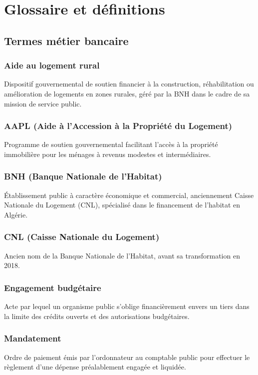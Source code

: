 \chapter{Glossaire et définitions}
\label{app:glossaire}

\section{Termes métier bancaire}

\subsection{Aide au logement rural}
Dispositif gouvernemental de soutien financier à la construction, réhabilitation ou amélioration de logements en zones rurales, géré par la BNH dans le cadre de sa mission de service public.

\subsection{AAPL (Aide à l'Accession à la Propriété du Logement)}
Programme de soutien gouvernemental facilitant l'accès à la propriété immobilière pour les ménages à revenus modestes et intermédiaires.

\subsection{BNH (Banque Nationale de l'Habitat)}
Établissement public à caractère économique et commercial, anciennement Caisse Nationale du Logement (CNL), spécialisé dans le financement de l'habitat en Algérie.

\subsection{CNL (Caisse Nationale du Logement)}
Ancien nom de la Banque Nationale de l'Habitat, avant sa transformation en 2018.

\subsection{Engagement budgétaire}
Acte par lequel un organisme public s'oblige financièrement envers un tiers dans la limite des crédits ouverts et des autorisations budgétaires.

\subsection{Mandatement}
Ordre de paiement émis par l'ordonnateur au comptable public pour effectuer le règlement d'une dépense préalablement engagée et liquidée.

